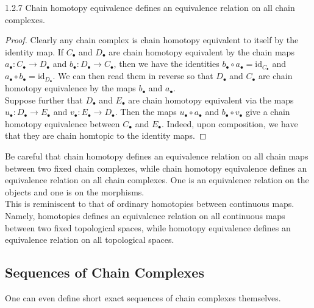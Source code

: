 \documentclass[a4paper]{article}
\begin{document}
\begin{prp}{}{1.2.7} Chain homotopy equivalence defines an equivalence relation on all chain complexes. 
\begin{proof}
Clearly any chain complex is chain homotopy equivalent to itself by the identity map. If $C_\bullet$ and $D_\bullet$ are chain homotopy equivalent by the chain maps $a_\bullet:C_\bullet\to D_\bullet$ and $b_\bullet:D_\bullet\to C_\bullet$, then we have the identities $b_\bullet\circ a_\bullet=\text{id}_{C_\bullet}$ and $a_\bullet\circ b_\bullet=\text{id}_{D_\bullet}$. We can then read them in reverse so that $D_\bullet$ and $C_\bullet$ are chain homotopy equivalence by the maps $b_\bullet$ and $a_\bullet$. \\

Suppose further that $D_\bullet$ and $E_\bullet$ are chain homotopy equivalent via the maps $u_\bullet:D_\bullet\to E_\bullet$ and $v_\bullet:E_\bullet\to D_\bullet$. Then the maps $u_\bullet\circ a_\bullet$ and $b_\bullet\circ v_\bullet$ give a chain homotopy equivalence between $C_\bullet$ and $E_\bullet$. Indeed, upon composition, we have that they are chain  homtopic to the identity maps. 
\end{proof}
\end{prp}

Be careful that chain homotopy defines an equivalence relation on all chain maps between two fixed chain complexes, while chain homotopy equivalence defines an equivalence relation on all chain complexes. One is an equivalence relation on the objects and one is on the morphisms. \\

This is reminiscent to that of ordinary homotopies between continuous maps. Namely, homotopies defines an equivalence relation on all continuous maps between two fixed topological spaces, while homotopy equivalence defines an equivalence relation on all topological spaces. 

\subsection{Sequences of Chain Complexes}
One can even define short exact sequences of chain complexes themselves. 
\end{document}
